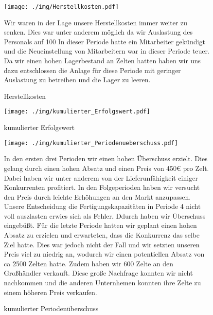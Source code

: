 \documentclass[a4paper, 12pt]{report}
\begin{document}
\begin{flushleft}
 \begin{figure}[th]
 \centering 
 \texttt{[image: ./img/Herstellkosten.pdf]}
  \caption[Herstellkosten]{Herstellkosten}
\begin{flushleft}
Wir waren in der Lage unsere Herstellkosten immer weiter zu senken. Dies war unter anderem möglich da wir Auslastung des Personals auf 100%
In dieser Periode hatte ein Mitarbeiter gekündigt und die Neueinstellung von Mitarbeitern war in dieser Periode teuer. Da wir einen hohen Lagerbestand an Zelten hatten haben wir uns dazu entschlossen die Anlage für diese Periode mit geringer Auslastung zu betreiben und die Lager zu leeren.

\end{flushleft}
\end{figure}




 \begin{figure}[b]
 \centering 
 \texttt{[image: ./img/kumulierter\_Erfolgswert.pdf]}
  \caption[kumulierter Erfolgswert]{kumulierter Erfolgswert}
\end{figure}
 
 \begin{figure}
 \centering 
 \texttt{[image: ./img/kumulierter\_Periodenueberschuss.pdf]}
  \caption[kumulierter Periodenüberschuss]
  {kumulierter Periodenüberschuss}
  \begin{flushleft}
 In den ersten drei Perioden wir einen hohen Überschuss erzielt.
Dies gelang durch einen hohen Absatz und einen Preis von 450€ pro Zelt. 
Dabei haben wir unter anderem von der Lieferunfähigkeit einiger Konkurrenten profitiert.
In den Folgeperioden haben wir versucht den Preis durch leichte Erhöhungen an den Markt anzupassen. Unsere Entscheidung die Fertigungskapazitäten in Periode 4 nicht voll auszlasten erwies sich als Fehler. Ddurch haben wir Überschuss eingebüßt. 
Für die letzte Periode hatten wir geplant einen hohen Absatz zu erzielen und erwarteten, dass die Konkurrenz das selbe Ziel hatte. Dies war jedoch nicht der Fall und wir setzten unseren Preis viel zu niedrig an, wodurch wir einen potentiellen Absatz von ca 2500 Zelten hatte. Zudem haben wir 600 Zelte an den Großhändler verkauft. Diese große Nachfrage konnten wir nicht nachkommen und die anderen Unternhemen konnten ihre Zelte zu einem höheren Preis verkaufen.
  \end{flushleft}
\end{figure}


\end{flushleft}
\end{document}
